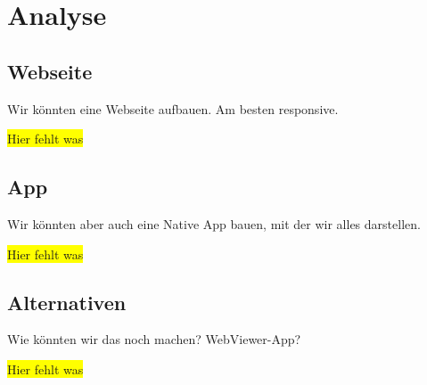 \section{Analyse}

\subsection{Webseite}
Wir könnten eine Webseite aufbauen. Am besten responsive.

\colorbox{yellow}{Hier fehlt was}

\subsection{App}
Wir könnten aber auch eine Native App bauen, mit der wir alles darstellen.

\colorbox{yellow}{Hier fehlt was}

\subsection{Alternativen}
Wie könnten wir das noch machen? WebViewer-App?

\colorbox{yellow}{Hier fehlt was}